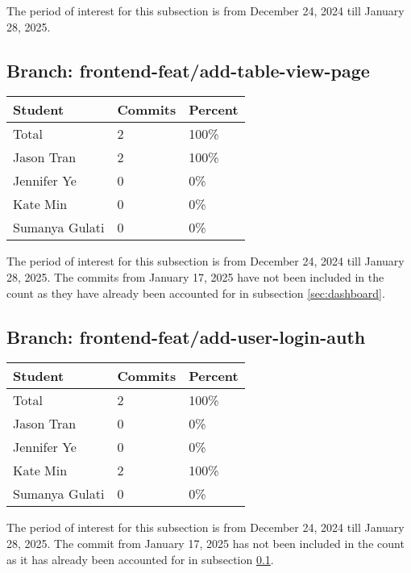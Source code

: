 \documentclass{article}
\begin{document}
The period of interest for this subsection is from December 24, 2024 till January 28, 2025. 

\subsection{Branch: frontend-feat/add-table-view-page} \label{sec:tableview}

\begin{table}[H]
\centering
\begin{tabular}{lll}
\toprule
\textbf{Student} & \textbf{Commits} & \textbf{Percent}\\
\midrule
Total & 2 & 100\% \\
Jason Tran & 2 & 100\% \\
Jennifer Ye & 0 & 0\% \\
Kate Min & 0 & 0\% \\
Sumanya Gulati & 0 & 0\% \\
\bottomrule
\end{tabular}
\end{table}

The period of interest for this subsection is from December 24, 2024 till January 28, 2025. The commits 
from January 17, 2025 have not been included in the count as they have already been 
accounted for in subsection \ref{sec:dashboard}.

\subsection{Branch: frontend-feat/add-user-login-auth} \label{sec:login}

\begin{table}[H]
\centering
\begin{tabular}{lll}
\toprule
\textbf{Student} & \textbf{Commits} & \textbf{Percent}\\
\midrule
Total & 2 & 100\% \\
Jason Tran & 0 & 0\% \\
Jennifer Ye & 0 & 0\% \\
Kate Min & 2 & 100\% \\
Sumanya Gulati & 0 & 0\% \\
\bottomrule
\end{tabular}
\end{table}

The period of interest for this subsection is from December 24, 2024 till January 28, 2025. The commit 
from January 17, 2025 has not been included in the count as it has already been 
accounted for in subsection \ref{sec:tableview}. 
\end{document}
